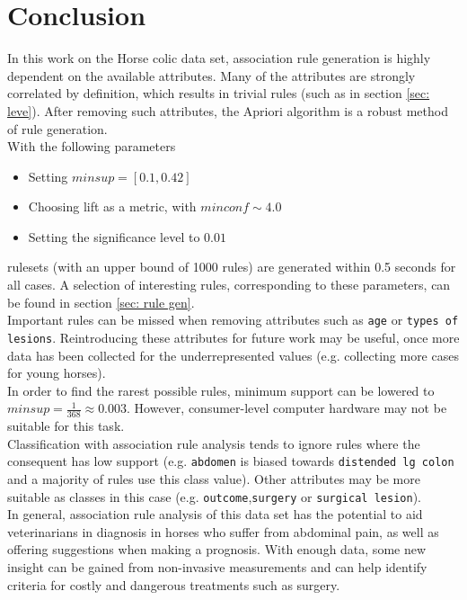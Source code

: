 \section{Conclusion}
In this work on the Horse colic data set, association rule generation is highly dependent on the available attributes.
Many of the attributes are strongly correlated by definition, which results in trivial rules (such as in section \ref{sec: leve}). After removing such attributes, the Apriori algorithm is a robust method of rule generation.\\

\noindent
With the following parameters
\begin{itemize}
\item Setting $minsup = \left[0.1, 0.42 \right]$
\item Choosing lift as a metric, with $minconf \sim 4.0$
\item Setting the significance level to $0.01$
\end{itemize}
rulesets (with an upper bound of 1000 rules) are generated within 0.5 seconds for all cases. A selection of interesting rules, corresponding to these parameters, can be found in section \ref{sec: rule gen}.\\

\noindent
Important rules can be missed when removing attributes such as \verb|age| or \verb|types of lesions|. Reintroducing these attributes for future work may be useful, once more data has been collected for the underrepresented values (e.g. collecting more cases for young horses).\\

\noindent
In order to find the rarest possible rules, minimum support can be lowered to $minsup = \frac{1}{368} \approx 0.003$. However, consumer-level computer hardware may not be suitable for this task.\\


\noindent
Classification with association rule analysis tends to ignore rules where the consequent has low support (e.g. \verb|abdomen| is biased towards \verb|distended lg colon| and a majority of rules use this class value). Other attributes may be more suitable as classes in this case (e.g. \verb|outcome|,\verb|surgery| or \verb|surgical lesion|).\\


\noindent
In general, association rule analysis of this data set has the potential to aid veterinarians in diagnosis in horses who suffer from abdominal pain, as well as offering suggestions when making a prognosis. With enough data, some new insight can be gained from non-invasive measurements and can help identify criteria for costly and dangerous treatments such as surgery.

